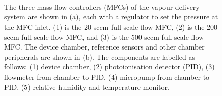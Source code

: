 \documentclass[
  a4paper,
]{scrbook}
\begin{document}
\begin{figure}
\begin{minipage}[t]{0.11\linewidth}
{~

}

\end{minipage}%
%
\begin{minipage}[t]{0.03\linewidth}

{\centering 


}

\end{minipage}%
%
\begin{minipage}[t]{0.01\linewidth}

{\centering 

~

}

\end{minipage}%
%
\begin{minipage}[t]{0.70\linewidth}

{\centering 


}

\end{minipage}%
%
\begin{minipage}[t]{0.15\linewidth}

{\centering 

~

}

\end{minipage}%

\caption[Layout of the vapour delivery system, showing the three mass
flow controllers (MFCs), the device chamber, photoionisation detector
(PID), PID flowmeter, PID micropump and the relative temperature and
humidity monitor (RHI).]{\label{fig-delivery-system}The three mass flow
controllers (MFCs) of the vapour delivery system are shown in (a), each
with a regulator to set the pressure at the MFC inlet. (1) is the 20
sccm full-scale flow MFC, (2) is the 200 sccm full-scale flow MFC, and
(3) is the 500 sccm full-scale flow MFC. The device chamber, reference
sensors and other chamber peripherals are shown in (b). The components
are labelled as follows: (1) device chamber, (2) photoionisation
detector (PID), (3) flowmeter from chamber to PID, (4) micropump from
chamber to PID, (5) relative humidity and temperature monitor.}

\end{figure}
\end{document}
